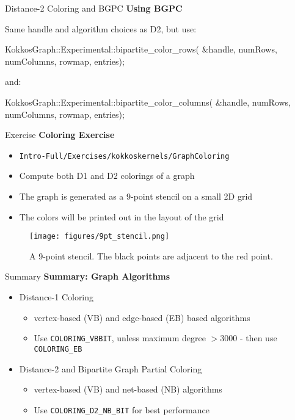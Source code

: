 \begin{frame}[fragile]{Distance-2 Coloring and BGPC}
\textbf{Using BGPC} 

Same handle and algorithm choices as D2, but use:
\begin{code}
KokkosGraph::Experimental::bipartite_color_rows(
  &handle, numRows, numColumns, rowmap, entries);
\end{code}

and:

\begin{code}
KokkosGraph::Experimental::bipartite_color_columns(
  &handle, numRows, numColumns, rowmap, entries);
\end{code}
\end{frame}

\begin{frame}[fragile]{Exercise}
\textbf{Coloring Exercise}
\begin{itemize}
  \item \verb!Intro-Full/Exercises/kokkoskernels/GraphColoring!
  \item Compute both D1 and D2 colorings of a graph
  \item The graph is generated as a 9-point stencil on a small 2D grid
  \item The colors will be printed out in the layout of the grid
\end{itemize}
\begin{figure}[h!]
  \texttt{[image: figures/9pt\_stencil.png]}
  \caption{A 9-point stencil. The black points are adjacent to the red point.}
\end{figure}

\end{frame}

\begin{frame}[fragile]{Summary}
\textbf{Summary: Graph Algorithms}
\begin{itemize}
  \item Distance-1 Coloring
  \begin{itemize}
    \item vertex-based (VB) and edge-based (EB) based algorithms
    \item Use \verb!COLORING_VBBIT!, unless maximum degree $> 3000$ - then use \verb!COLORING_EB!
  \end{itemize}
  \item Distance-2 and Bipartite Graph Partial Coloring
  \begin{itemize}
    \item vertex-based (VB) and net-based (NB) algorithms
    \item Use \verb!COLORING_D2_NB_BIT! for best performance
  \end{itemize}
\end{itemize}

\end{frame}
